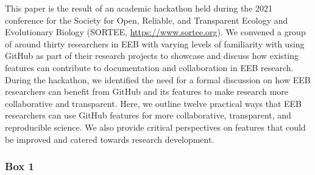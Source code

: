 This paper is the result of an academic hackathon held during the 2021 conference for the Society for Open, Reliable, and Transparent Ecology and Evolutionary Biology (SORTEE, \url{https://www.sortee.org}).
We convened a group of around thirty researchers in EEB with varying levels of familiarity with using GitHub as part of their research projects to showcase and discuss how existing features can contribute to documentation and collaboration in EEB research.
During the hackathon, we identified the need for a formal discussion on how EEB researchers can benefit from GitHub and its features to make research more collaborative and transparent.
Here, we outline twelve practical ways that EEB researchers can use GitHub features for more collaborative, transparent, and reproducible science.
We also provide critical perspectives on features that could be improved and catered towards research development.

\hypertarget{definitions}{%
\subsubsection{Box 1}\label{definitions}}

